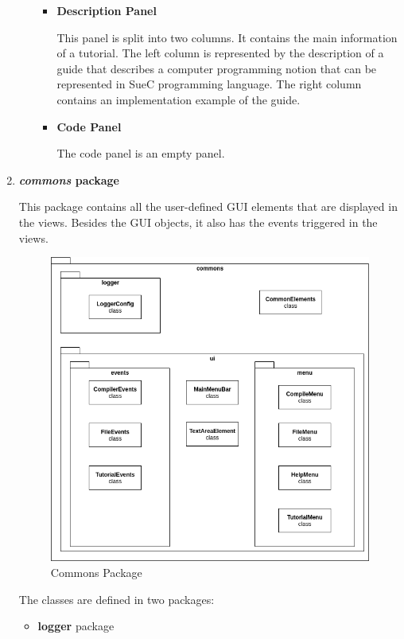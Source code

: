 \documentclass[12pt,a4paper,twoside]{report}
\begin{document}
\begin{enumerate}
\begin{enumerate}
\begin{itemize}
 \item \textbf{Description Panel}
 
 This panel is split into two columns. It contains the main information of a tutorial. The left column is represented by the description of a guide that describes a computer programming notion that can be represented in SueC programming language. The right column contains an implementation example of the guide.
 
 \item \textbf{Code Panel}
 
 The code panel is an empty panel.  
 \end{itemize}


\end{enumerate}



\item \textbf{\textit{commons} package}

This package contains all the user-defined GUI elements that are displayed in the views. Besides the GUI objects, it also has the events triggered in the views. 

\begin{figure}[H]
    \centering
    \includegraphics[width=0.8\linewidth]{img/CommonsPackage.png}
    \caption{Commons Package}
    \label{fig:conf}
\end{figure}

The classes are defined in two packages: 
\begin{itemize}
 \item \textbf{logger} package 
 

\end{itemize}
\end{enumerate}
\end{document}

